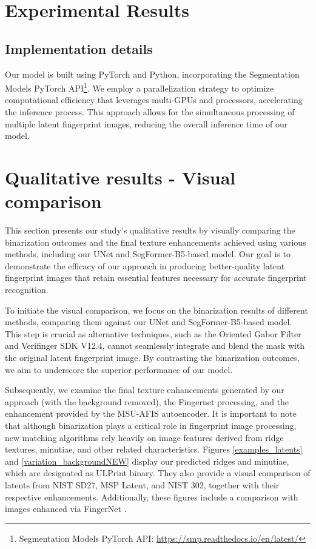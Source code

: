 \documentclass[twocolumn, switch]{article} %
\begin{document}
\section{Experimental Results}


\subsection{Implementation details}

Our model is built using PyTorch and Python, incorporating the Segmentation Models PyTorch API\footnote{Segmentation Models PyTorch API: \url{https://smp.readthedocs.io/en/latest/}}. We employ a parallelization strategy to optimize computational efficiency that leverages multi-GPUs and processors, accelerating the inference process. This approach allows for the simultaneous processing of multiple latent fingerprint images, reducing the overall inference time of our model.


\section{Qualitative results - Visual comparison}

This section presents our study's qualitative results by visually comparing the binarization outcomes and the final texture enhancements achieved using various methods, including our UNet and SegFormer-B5-based model. Our goal is to demonstrate the efficacy of our approach in producing better-quality latent fingerprint images that retain essential features necessary for accurate fingerprint recognition.

To initiate the visual comparison, we focus on the binarization results of different methods, comparing them against our UNet and SegFormer-B5-based model. This step is crucial as alternative techniques, such as the Oriented Gabor Filter \cite{hong1998fingerprint} and Verifinger SDK V12.4, cannot seamlessly integrate and blend the mask with the original latent fingerprint image. By contrasting the binarization outcomes, we aim to underscore the superior performance of our model.

Subsequently, we examine the final texture enhancements generated by our approach (with the background removed), the Fingernet \cite{tang2017FingerNet} processing, and the enhancement provided by the MSU-AFIS autoencoder. It is important to note that although binarization plays a critical role in fingerprint image processing, new matching algorithms rely heavily on image features derived from ridge textures, minutiae, and other related characteristics. Figures \ref{examples_latents} and \ref{variation_backgroundNEW} display our predicted ridges and minutiae, which are designated as ULPrint binary. They also provide a visual comparison of latents from NIST SD27, MSP Latent, and NIST 302, together with their respective enhancements. Additionally, these figures include a comparison with images enhanced via FingerNet \cite{tang2017FingerNet}.
\end{document}
